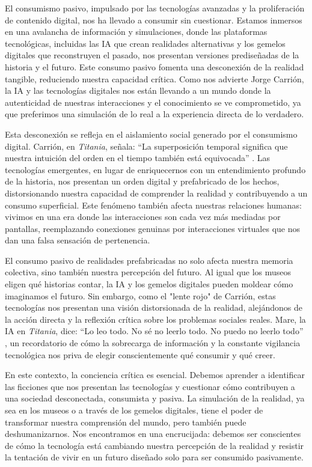 \documentclass[
  spanish,
  11pt,
  a4paper,
]{scrbook}
\begin{document}
El consumismo pasivo, impulsado por las tecnologías avanzadas y la
proliferación de contenido digital, nos ha llevado a consumir sin
cuestionar. Estamos inmersos en una avalancha de información y
simulaciones, donde las plataformas tecnológicas, incluidas las IA que
crean realidades alternativas y los gemelos digitales que reconstruyen
el pasado, nos presentan versiones prediseñadas de la historia y el
futuro. Este consumo pasivo fomenta una desconexión de la realidad
tangible, reduciendo nuestra capacidad crítica. Como nos advierte Jorge
Carrión, la IA y las tecnologías digitales nos están llevando a un mundo
donde la autenticidad de nuestras interacciones y el conocimiento se ve
comprometido, ya que preferimos una simulación de lo real a la
experiencia directa de lo verdadero.

Esta desconexión se refleja en el aislamiento social generado por el
consumismo digital. Carrión, en \emph{Titania}, señala: ``La
superposición temporal significa que nuestra intuición del orden en el
tiempo también está equivocada'' \autocite[58]{Carrion2022}. Las
tecnologías emergentes, en lugar de enriquecernos con un entendimiento
profundo de la historia, nos presentan un orden digital y prefabricado
de los hechos, distorsionando nuestra capacidad de comprender la
realidad y contribuyendo a un consumo superficial. Este fenómeno también
afecta nuestras relaciones humanas: vivimos en una era donde las
interacciones son cada vez más mediadas por pantallas, reemplazando
conexiones genuinas por interacciones virtuales que nos dan una falsa
sensación de pertenencia.

El consumo pasivo de realidades prefabricadas no solo afecta nuestra
memoria colectiva, sino también nuestra percepción del futuro. Al igual
que los museos eligen qué historias contar, la IA y los gemelos
digitales pueden moldear cómo imaginamos el futuro. Sin embargo, como el
"lente rojo" de Carrión, estas tecnologías nos presentan una visión
distorsionada de la realidad, alejándonos de la acción directa y la
reflexión crítica sobre los problemas sociales reales. Mare, la IA en
\emph{Titania}, dice: ``Lo leo todo. No sé no leerlo todo. No puedo no
leerlo todo'' \autocite[59]{Carrion2022}, un recordatorio de cómo la
sobrecarga de información y la constante vigilancia tecnológica nos
priva de elegir conscientemente qué consumir y qué creer.

En este contexto, la conciencia crítica es esencial. Debemos aprender a
identificar las ficciones que nos presentan las tecnologías y cuestionar
cómo contribuyen a una sociedad desconectada, consumista y pasiva. La
simulación de la realidad, ya sea en los museos o a través de los
gemelos digitales, tiene el poder de transformar nuestra comprensión del
mundo, pero también puede deshumanizarnos. Nos encontramos en una
encrucijada: debemos ser conscientes de cómo la tecnología está
cambiando nuestra percepción de la realidad y resistir la tentación de
vivir en un futuro diseñado solo para ser consumido pasivamente.
\end{document}
